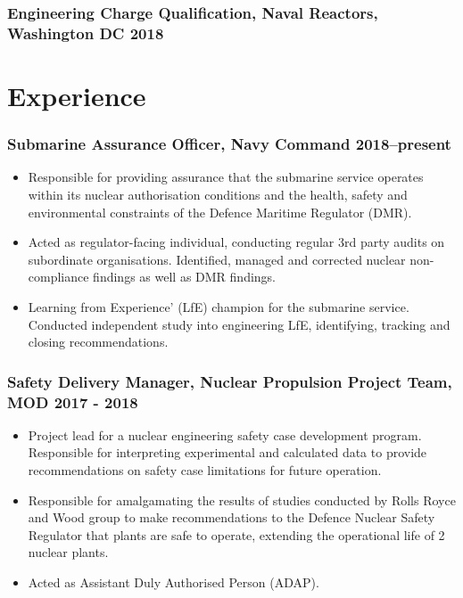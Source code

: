 \documentclass[a4paper, oneside, final, 11pt]{scrartcl} %
\begin{document}
\subsubsection*{Engineering Charge Qualification, Naval Reactors, Washington DC \hfill 2018}  


\medskip


\section{Experience}

\subsubsection*{Submarine Assurance Officer, Navy Command \hfill 2018--present}  
\normalfont
\begin{itemize}

\item Responsible for providing
assurance that the submarine service operates within its nuclear authorisation conditions and the health, safety and environmental constraints of the Defence Maritime Regulator (DMR).

\item Acted as regulator-facing individual, conducting regular 3rd party audits on subordinate organisations. Identified, managed and corrected nuclear non-compliance findings as well as DMR findings.

\item Learning from Experience’ (LfE) champion for the submarine service. Conducted independent study into engineering LfE, identifying, tracking and closing recommendations.

\end{itemize}

\smallskip 

\subsubsection*{Safety Delivery Manager,  Nuclear Propulsion Project Team, MOD \hfill 2017 - 2018}  
\normalfont
\begin{itemize}

\item Project lead for a nuclear engineering safety case development program.  Responsible for interpreting experimental and calculated data to provide recommendations on safety case limitations for future operation.

\item Responsible for amalgamating the results of studies conducted by Rolls Royce and Wood group to make recommendations to the Defence Nuclear Safety Regulator that plants are safe to operate, extending the operational life of 2 nuclear plants.

\item Acted as Assistant Duly Authorised Person (ADAP). 

\end{itemize}
\end{document}
